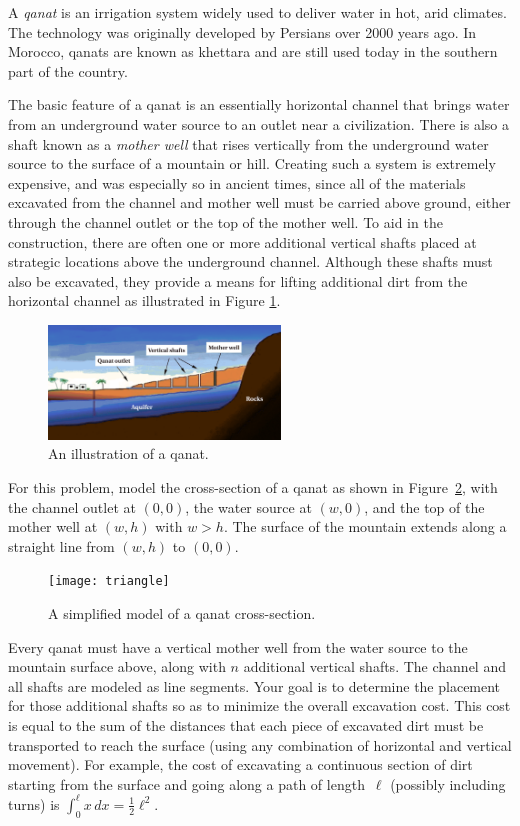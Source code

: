 
A {\em qanat\/} is an irrigation system widely used to deliver water in
hot, arid climates. The technology was originally developed by Persians
over 2000 years ago. In Morocco, qanats are known as khettara and are 
still used today in the southern part of the country.

The basic feature of a qanat is an essentially horizontal channel that
brings water from an underground water source to an outlet near a
civilization. There is also a shaft known as a {\em mother
well\/} that rises vertically from the underground water source to the
surface of a mountain or hill. Creating such a system is extremely
expensive, and was especially so in ancient times, since all of the materials
excavated from the channel and mother well must be carried above ground,
either through the channel outlet or the top of the mother well.
To aid in the construction, there are often one or more additional
vertical shafts placed at strategic locations above the underground
channel. Although these shafts must also be excavated, they provide
a means for lifting additional dirt from the horizontal channel as illustrated in Figure \ref{fig:qanat}.

\begin{figure}[!h]
\centering
\includegraphics[width=0.55\textwidth]{qanat}
\vspace{-0.5cm}
\caption{An illustration of a qanat.}
\label{fig:qanat}
\end{figure}

For this problem, model the cross-section of a qanat as shown in
Figure~\ref{fig:model}, with the channel outlet at $(0,0)$,
the water source at $(w,0)$, and the top of the mother well at $(w,h)$ with $w > h$. The
surface of the mountain extends along a straight line from $(w,h)$ to $(0,0)$.

\begin{figure}[!h]
\centering
\texttt{[image: triangle]}
\caption{A simplified model of a qanat cross-section.}
\label{fig:model}
\end{figure}

Every qanat must have a vertical mother well from the water source to
the mountain surface above, along with $n$
additional vertical shafts. The channel and all shafts are modeled as
line segments. Your goal is to determine the placement
for those additional shafts so as to minimize the overall
excavation cost. This cost is equal to the sum of the
distances that each piece of excavated dirt  must be transported to reach 
the surface (using any combination of horizontal and vertical
movement). For example, the cost of excavating a continuous section of
dirt starting from the surface and going along a path of length~$\ell$ (possibly including
turns) is $\int_0^{\ell} x \,dx = \frac{1}{2} \ell^2$.

